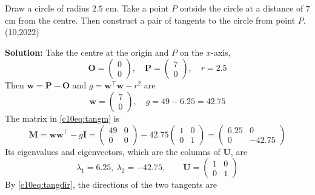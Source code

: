 \nopagebreak[4]
\begin{center}
\end{center}

\clearpage
\item Draw a circle of radius $2.5$ cm. Take a point $P$ outside the circle at a distance of $7$ cm from the centre. Then construct a pair of tangents to the circle from point $P$. \hfill (10,2022)

\textbf{Solution:} Take the centre at the origin and $P$ on the $x$-axis,
\begin{equation}
\mathbf{O} = \begin{pmatrix} 0 \\ 0 \end{pmatrix}, \quad \mathbf{P} = \begin{pmatrix} 7 \\ 0 \end{pmatrix}, \quad r = 2.5
\end{equation}
Then $\mathbf{w} = \mathbf{P} - \mathbf{O}$ and $g = \mathbf{w}^{\top}\mathbf{w} - r^2$ are
\begin{equation}
\mathbf{w} = \begin{pmatrix} 7 \\ 0 \end{pmatrix}, \quad g = 49 - 6.25 = 42.75
\end{equation}
The matrix in \eqref{c10eq:tangm} is
\begin{equation}
\mathbf{M} = \mathbf{w}\mathbf{w}^{\top} - g\mathbf{I} = \begin{pmatrix} 49 & 0 \\ 0 & 0 \end{pmatrix} - 42.75\begin{pmatrix} 1 & 0 \\ 0 & 1 \end{pmatrix} = \begin{pmatrix} 6.25 & 0 \\ 0 & -42.75 \end{pmatrix}
\end{equation}
Its eigenvalues and eigenvectors, which are the columns of $\mathbf{U}$, are
\begin{equation}
\lambda_1 = 6.25, \ \lambda_2 = -42.75, \qquad \mathbf{U} = \begin{pmatrix} 1 & 0 \\ 0 & 1 \end{pmatrix}
\end{equation}
By \eqref{c10eq:tangdir}, the directions of the two tangents are
